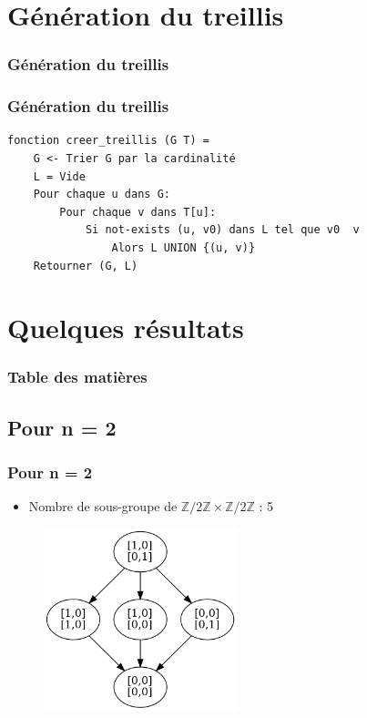 \documentclass{beamer}
\begin{document}
\section{Génération du treillis}
\begin{frame}
\frametitle{Génération du treillis}
\tableofcontents[currentsection]
\end{frame}

\begin{frame}[fragile]
\frametitle{Génération du treillis}
\begin{verbatim}
fonction creer_treillis (G T) =
    G <- Trier G par la cardinalité
    L = Vide
    Pour chaque u dans G:
        Pour chaque v dans T[u]:
            Si not-exists (u, v0) dans L tel que v0  v
                Alors L UNION {(u, v)}
    Retourner (G, L)
\end{verbatim}
\end{frame}


\section{Quelques résultats}
\begin{frame}
\frametitle{Table des matières}
\tableofcontents[currentsection]
\end{frame}


\subsection{Pour n = 2}
\begin{frame}
\frametitle{Pour n = 2}
\begin{itemize}
    \item Nombre de sous-groupe de $\mathbb{Z}/2\mathbb{Z} \times \mathbb{Z}/2\mathbb{Z}$ : 5
\end{itemize}
\begin{figure}
  \centering
  \includegraphics[width=0.5\textwidth]{Z2ZxZ2Z.png}
\end{figure}
\end{frame}
\end{document}
